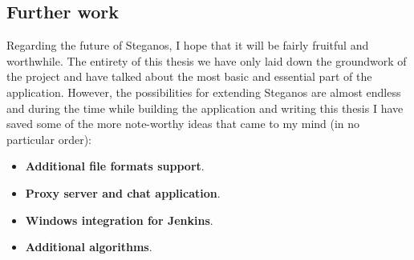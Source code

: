 \begin{multicols}{2}
\section{Further work}
Regarding the future of Steganos, I hope that it will be fairly fruitful and worthwhile. The entirety of this thesis we have only laid down the groundwork of the project and have talked about the most basic and essential part of the application. However, the possibilities for extending Steganos are almost endless and during the time while building the application and writing this thesis I have saved some of the more note-worthy ideas that came to my mind (in no particular order):
\begin{itemize}
	\item \textbf{Additional file formats support}.
	\item \textbf{Proxy server and chat application}.
	\item \textbf{Windows integration for Jenkins}.
	\item \textbf{Additional algorithms}.
\end{itemize}
\end{multicols}